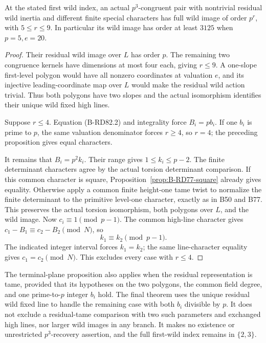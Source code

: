 \begin{theorem}
\label{thm:B-RD82}
At the stated first wild index, an actual \(p^3\)-congruent
pair with nontrivial residual wild inertia and different
finite special characters has full wild image of order
\(p^r\), with \(5\le r\le9\). In particular its wild
image has order at least \(3125\) when \(p=5,e=20\).
\end{theorem}
\begin{proof}
Their residual wild image over \(L\) has order \(p\).
The remaining two congruence kernels have dimensions at
most four each, giving \(r\le9\). A one-slope first-level
polygon would have all nonzero coordinates at valuation
\(e\), and its injective leading-coordinate map over \(L\)
would make the residual wild action trivial. Thus both
polygons have two slopes and the actual isomorphism
identifies their unique wild fixed high lines.

Suppose \(r\le4\). Equation (B-RD82.2) and integrality
force \(B_i=pb_i\). If one \(b_i\) is prime to \(p\),
the same valuation denominator forces \(r\ge4\), so
\(r=4\); the preceding proposition gives equal characters.

It remains that \(B_i=p^2k_i\). Their range gives
\(1\le k_i\le p-2\). The finite determinant characters
agree by the actual torsion determinant comparison.
If this common character is square,
Proposition~\ref{prop:B-RD77-square} already gives equality.
Otherwise apply a common finite height-one tame twist
to normalize the finite determinant to the primitive
level-one character, exactly as in B50 and B77.
This preserves the actual torsion isomorphism, both
polygons over \(L\), and the wild image. Now
\(c_i\equiv1\pmod{p-1}\). The common high-line character
gives \(c_1-B_1\equiv c_2-B_2\pmod N\), so
\[
                 k_1\equiv k_2\pmod{p-1}.             \tag{B-RD82.9}
\]
The indicated integer interval forces \(k_1=k_2\);
the same line-character equality gives \(c_1=c_2\pmod N\).
This excludes every case with \(r\le4\).
\end{proof}

\begin{remark}
\label{rem:B-RD82-scope}
The terminal-plane proposition also applies when the residual
representation is tame, provided that its hypotheses on the
two polygons, the common field degree, and one prime-to-\(p\)
integer \(b_i\) hold. The final theorem uses the unique
residual wild fixed line to handle the remaining case with
both \(b_i\) divisible by \(p\). It does not exclude a
residual-tame comparison with two such parameters and
exchanged high lines, nor larger wild images in any branch.
It makes no existence or unrestricted \(p^3\)-recovery
assertion, and the full first-wild index remains in \(\{2,3\}\).
\end{remark}

